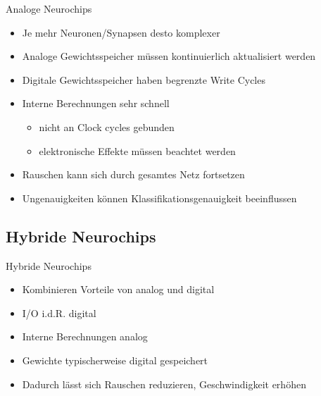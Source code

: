 \documentclass[handout]{beamer}
\begin{document}
    \begin{frame} {Analoge Neurochips}
        \begin{itemize}
            \item Je mehr Neuronen/Synapsen desto komplexer
            \item Analoge Gewichtsspeicher müssen kontinuierlich aktualisiert werden
            \item Digitale Gewichtsspeicher haben begrenzte Write Cycles
            \item Interne Berechnungen sehr schnell
            \begin{itemize}
                \item nicht an Clock cycles gebunden
                \item elektronische Effekte müssen beachtet werden
            \end{itemize}
            \item Rauschen kann sich durch gesamtes Netz fortsetzen
            \item Ungenauigkeiten können Klassifikationsgenauigkeit beeinflussen
        \end{itemize}
    \end{frame}

    \subsection{Hybride Neurochips}

    \begin{frame}{Hybride Neurochips}
        \begin{itemize}
            \item Kombinieren Vorteile von analog und digital
            \item I/O i.d.R. digital
            \item Interne Berechnungen analog
            \item Gewichte typischerweise digital gespeichert
            \item Dadurch lässt sich Rauschen reduzieren, Geschwindigkeit erhöhen
        \end{itemize}
    \end{frame}
\end{document}
